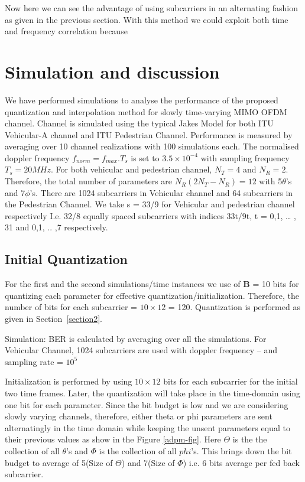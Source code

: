 \documentclass[conference]{IEEEtran}
\begin{document}
Now here we can see the advantage of using subcarriers in an alternating fashion as given in the previous section. With this method we could exploit both time and frequency correlation because

\section{Simulation and discussion}
\label{section3}

 We have performed simulations to analyse the performance of the proposed quantization and interpolation method for slowly time-varying MIMO OFDM channel. Channel is simulated using the typical Jakes Model for both ITU Vehicular-A channel and ITU Pedestrian Channel. Performance is measured by averaging over 10 channel realizations with 100 simulations each. The normalised doppler frequency $f_{norm} = f_{max}.T_s$ is set to $3.5\times10^{-4}$ with sampling frequency $T_s = 20MHz$. For both vehicular and pedestrian channel, $N_T=4$ and $N_R=2$. Therefore, the total number of parameters are $N_{R}(2N_{T} - N_{R}) = 12$ with 5$\theta$’s and 7$\phi$’s. There are 1024 subcarriers in Vehicular channel and 64 subcarriers in the Pedestrian Channel. We take s = 33/9 for Vehicular and pedestrian channel respectively I.e. 32/8 equally spaced subcarriers with indices 33t/9t, t = 0,1, … , 31 and 0,1, .. ,7 respectively.

\subsection{Initial Quantization}
For the first and the second simulations/time instances we use of $\textbf{B}$ = 10 bits for quantizing each parameter for effective quantization/initialization. Therefore, the number of bits for each subcarrier = $10\times12$ = 120. Quantization is performed as given in Section~\ref{section2}.

Simulation: BER is calculated by averaging over all the simulations. For Vehicular Channel, 1024 subcarriers are used with doppler frequency – and sampling rate = $10^{5}$

Initialization is performed by using $10\times12$ bits for each subcarrier for the initial two time frames. Later, the quantization will take place in the time-domain using one bit for each parameter. Since the bit budget is low and we are considering slowly varying channels, therefore, either theta or phi parameters are sent alternatingly in the time domain while keeping the unsent parameters equal to their previous values as show in the Figure \ref{adpm-fig}. Here $\Theta$ is the the collection of all $\theta$'s and $\Phi$ is the collection of all $phi$'s. This brings down the bit budget to average of 5(Size of $\Theta$) and 7(Size of $\Phi$) i.e. 6 bits average per fed back subcarrier.
\end{document}
